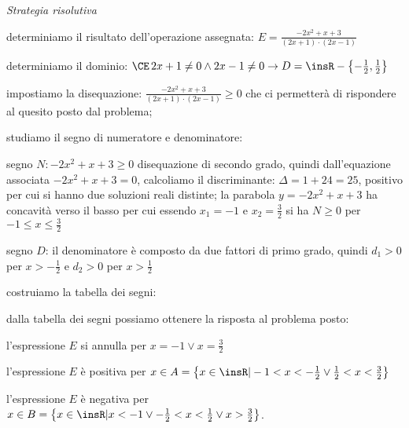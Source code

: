 \begin{exrig}
\begin{esempio}
\emph{Strategia risolutiva}
\begin{enumeratea}
\item determiniamo il risultato dell'operazione assegnata: 
$E=\frac{-2x^2+x+3}{(2x+1)\cdot (2x-1)}$
\item determiniamo il dominio: $\CE\, 2x+1\neq 0\wedge 2x-1\neq 0\to 
D=\insR-\left\{-\frac 1 2,\frac 1 2\right\}$
\item impostiamo la disequazione: $\frac{-2x^2+x+3}{(2x+1)\cdot (2x-1)}\ge 0$ 
che ci permetterà di rispondere al quesito posto dal problema;
\item studiamo il segno di numeratore e denominatore:
 \begin{itemize*}
\item segno $N: -2x^2+x+3\ge 0$ disequazione di secondo grado, quindi 
dall'equazione associata $-2x^2+x+3=0$, calcoliamo il discriminante: $\Delta 
=1+24=25$, positivo per cui si hanno due soluzioni reali distinte; la parabola 
$y=-2x^2+x+3$ ha concavità verso il basso per cui essendo $x_1=-1$ e $x_2=\frac 
3 2$ si ha $N\ge 0$ per $-1\le x\le \frac 3 2$
\item segno $D$: il denominatore è composto da due fattori di primo grado, 
quindi $d_1>0$ per $x>-\frac 1 2$ e $d_2>0$ per $x>\frac 1 2$
 \end{itemize*}
\item costruiamo la tabella dei segni:
\begin{center}
 
\end{center}
\item dalla tabella dei segni possiamo ottenere la risposta al problema posto:
\begin{itemize*}
\item l'espressione $E$ si annulla per $x=-1\vee x=\frac 3 2$
\item l'espressione $E$ è positiva per $x\in A=\left\{x\in \insR | -1<x<-\frac 1 
2\vee \frac 1 2<x<\frac 3 2\right\}$
\item l'espressione $E$ è negativa per $x\in B=\left\{x\in \insR | x<-1\vee 
-\frac 1 2<x<\frac 1 2\vee x>\frac 3 2\right\}$.
\end{itemize*}
\end{enumeratea}
\end{esempio}


\end{exrig}
